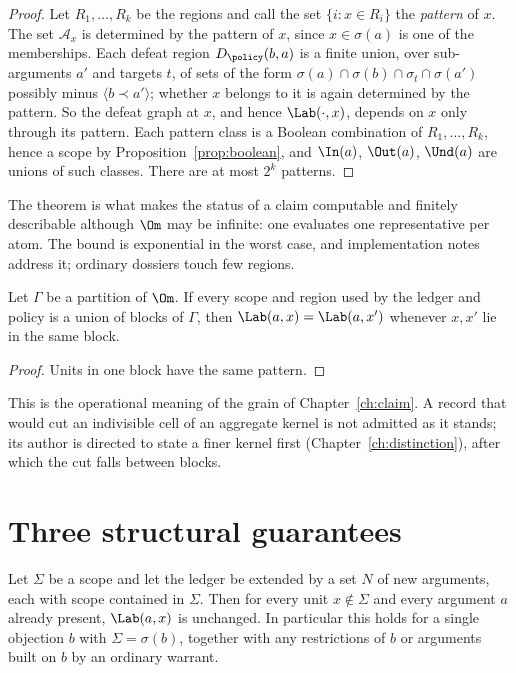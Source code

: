 \begin{proof}
Let $R_1,\dots,R_k$ be the regions and call the set $\{i:x\in R_i\}$ the \emph{pattern} of $x$. The set $\mathcal A_x$ is determined by the pattern of $x$, since $x\in\sigma(a)$ is one of the memberships. Each defeat region $D_\policy(b,a)$ is a finite union, over sub-arguments $a'$ and targets $t$, of sets of the form $\sigma(a)\cap\sigma(b)\cap\sigma_t\cap\sigma(a')$ possibly minus $\langle b\prec a'\rangle$; whether $x$ belongs to it is again determined by the pattern. So the defeat graph at $x$, and hence $\Lab(\cdot,x)$, depends on $x$ only through its pattern. Each pattern class is a Boolean combination of $R_1,\dots,R_k$, hence a scope by Proposition~\ref{prop:boolean}, and $\In(a)$, $\Out(a)$, $\Und(a)$ are unions of such classes. There are at most $2^k$ patterns.
\end{proof}

The theorem is what makes the status of a claim computable and finitely describable although $\Om$ may be infinite: one evaluates one representative per atom. The bound is exponential in the worst case, and implementation notes address it; ordinary dossiers touch few regions.

\begin{proposition}\label{prop:grain}
Let $\Gamma$ be a partition of $\Om$. If every scope and region used by the ledger and policy is a union of blocks of $\Gamma$, then $\Lab(a,x)=\Lab(a,x')$ whenever $x,x'$ lie in the same block.
\end{proposition}

\begin{proof}
Units in one block have the same pattern.
\end{proof}

This is the operational meaning of the grain of Chapter~\ref{ch:claim}. A record that would cut an indivisible cell of an aggregate kernel is not admitted as it stands; its author is directed to state a finer kernel first (Chapter~\ref{ch:distinction}), after which the cut falls between blocks.

\section{Three structural guarantees}

\begin{theorem}\label{thm:local}
Let $\Sigma$ be a scope and let the ledger be extended by a set $N$ of new arguments, each with scope contained in $\Sigma$. Then for every unit $x\notin\Sigma$ and every argument $a$ already present, $\Lab(a,x)$ is unchanged. In particular this holds for a single objection $b$ with $\Sigma=\sigma(b)$, together with any restrictions of $b$ or arguments built on $b$ by an ordinary warrant.
\end{theorem}

